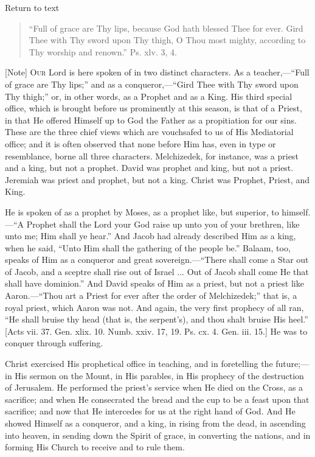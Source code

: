 Return to text


\begin{quote}

``Full of grace are Thy lips, because God hath blessed Thee
for ever. Gird Thee with Thy sword upon Thy thigh, O Thou most
mighty, according to Thy worship and renown.'' Ps. xlv. 3, 4.

\end{quote}

[Note] O\textsc{ur} Lord is here spoken of in two distinct characters. As a
teacher,—``Full of grace are Thy lips;'' and as a conqueror,—``Gird
Thee with Thy sword upon Thy thigh;'' or, in other words, as a
Prophet and as a King. His third special office, which is brought
before us prominently at this season,
is that of a Priest, in that He offered Himself up to God the Father
as a propitiation for our sins. These are the three chief views which
are vouchsafed to us of His Mediatorial office; and it is often
observed that none before Him has, even in type or resemblance, borne
all three characters. Melchizedek, for instance, was a priest and a
king, but not a prophet. David was prophet and king, but not a priest.
Jeremiah was priest and prophet, but not a king. Christ was Prophet,
Priest, and King.

He is spoken of as a prophet by Moses, as a prophet like, but
superior, to himself.—``A Prophet shall the Lord your God raise
up unto you of your brethren, like unto me; Him shall ye hear.''
And Jacob had already described Him as a king, when he said,
``Unto Him shall the gathering of the people be.'' Balaam,
too, speaks of Him as a conqueror and great sovereign.—``There
shall come a Star out of Jacob, and a sceptre shall rise out of Israel
... Out of Jacob shall come He that shall have dominion.'' And
David speaks of Him as a priest, but not a priest like Aaron.—``Thou
art a Priest for ever after the order of Melchizedek;'' that is, a
royal priest, which Aaron was not. And again, the very first prophecy
of all ran, ``He shall bruise thy head (that is, the serpent's),
and thou shalt bruise His heel.'' [Acts vii. 37. Gen. xlix. 10.
Numb. xxiv. 17, 19. Ps. cx. 4. Gen. iii. 15.] He was to conquer
through suffering.

Christ exercised His prophetical office in teaching, and in
foretelling the future;—in His sermon on the Mount, in His parables,
in His prophecy of the destruction of Jerusalem. He performed the
priest's service when He died on the Cross, as a sacrifice; and when
He consecrated the bread and the cup to be a feast upon that
sacrifice; and now that He intercedes for us at the right hand of God.
And He showed Himself as a conqueror, and a king, in rising from the
dead, in ascending into heaven, in sending down the Spirit of grace,
in converting the nations, and in forming His Church to receive and to
rule them.

